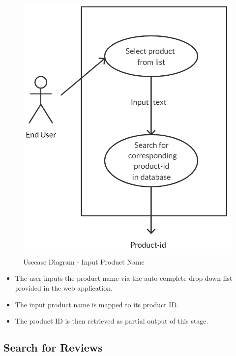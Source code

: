 \documentclass[11pt]{report}
\begin{document}
\begin{figure}[h]
\centering
\includegraphics[scale=0.5]{images/input_usecase.png}
\caption{Usecase Diagram - Input Product Name}
\label{fig:usecase1}
\end{figure}

\begin{itemize}
\item The user inputs the product name via the auto-complete drop-down list provided in the web application.
\item The input product name is mapped to its product ID. 
\item The product ID is then retrieved as partial output of this stage. 
\end{itemize}

\subsection{Search for Reviews}
\end{document}

